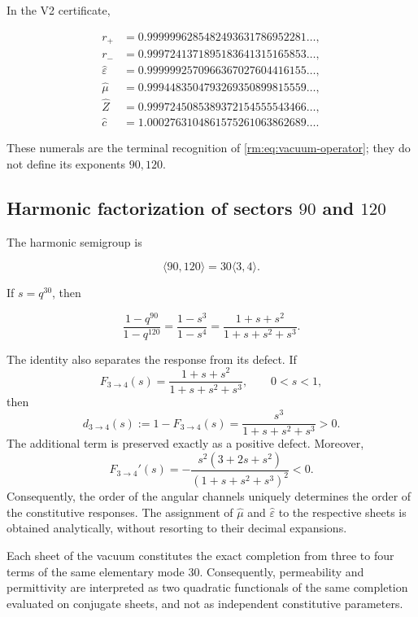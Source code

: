 In the V2 certificate,

\begin{align*}
r_+&=0.9999996285482493631786952281\ldots,\\
r_-&=0.9997241371895183641315165853\ldots,\\
\widehat\varepsilon&=0.9999992570966367027604416155\ldots,\\
\widehat\mu&=0.9994483504793269350899815559\ldots,\\
\widehat Z&=0.9997245085389372154555543466\ldots,\\
\widehat c&=1.0002763104861575261063862689\ldots.
\end{align*}

These numerals are the terminal recognition of \cref{rm:eq:vacuum-operator}; they do not define its exponents \(90,120\).

\subsection{Harmonic factorization of sectors \texorpdfstring{\(90\)}{90} and \texorpdfstring{\(120\)}{120}}

The harmonic semigroup is

\[
\langle90,120\rangle=30\langle3,4\rangle.
\]

If \(s=q^{30}\), then

\begin{equation}
\frac{1-q^{90}}{1-q^{120}}
=\frac{1-s^3}{1-s^4}
=\frac{1+s+s^2}{1+s+s^2+s^3}.
\label{rm:eq:three-four-completion}
\end{equation}

The identity also separates the response from its defect. If
\[
F_{3\to4}(s)=\frac{1+s+s^2}{1+s+s^2+s^3},
\qquad 0<s<1,
\]
then
\begin{equation}
d_{3\to4}(s):=1-F_{3\to4}(s)
=\frac{s^3}{1+s+s^2+s^3}>0.
\label{rm:eq:vacuum-defect34}
\end{equation}
The additional term is preserved exactly as a positive
defect. Moreover,
\begin{equation}
F_{3\to4}'(s)
=-\frac{s^2(3+2s+s^2)}{(1+s+s^2+s^3)^2}<0.
\label{rm:eq:vacuum-monotonic34}
\end{equation}
Consequently, the order of the angular channels uniquely determines
the order of the constitutive responses. The assignment of
\(\widehat\mu\) and \(\widehat\varepsilon\) to the respective sheets is obtained
analytically, without resorting to their decimal expansions.

Each sheet of the vacuum constitutes the exact completion from three to four
terms of the same elementary mode \(30\). Consequently, permeability
and permittivity are interpreted as two quadratic functionals of the same
completion evaluated on conjugate sheets, and not as independent
constitutive parameters.

